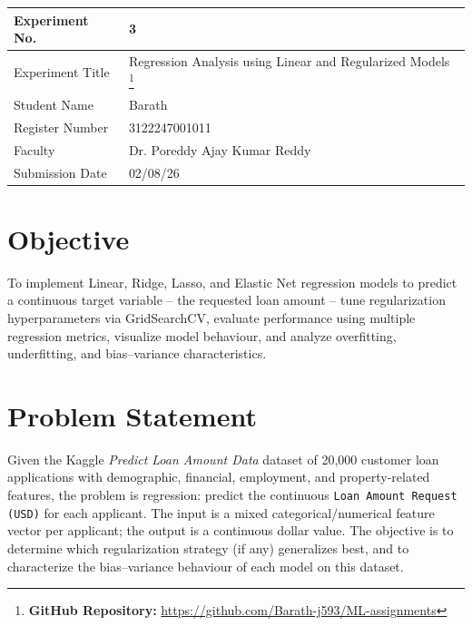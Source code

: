 \documentclass[12pt,a4paper]{article}
\begin{document}
\begin{tabular}{|p{4cm}|p{11cm}|}
\hline
Experiment No. & 3 \\ \hline
Experiment Title & Regression Analysis using Linear and Regularized Models
\footnote{\textbf{GitHub Repository: }\url{https://github.com/Barath-j593/ML-assignments}}\\ \hline
Student Name & Barath \\ \hline
Register Number & 3122247001011 \\ \hline
Faculty & Dr. Poreddy Ajay Kumar Reddy \\ \hline
Submission Date & 02/08/26 \\ \hline
\end{tabular}

\section{Objective}
To implement Linear, Ridge, Lasso, and Elastic Net regression models to predict a continuous
target variable -- the requested loan amount -- tune regularization hyperparameters via
GridSearchCV, evaluate performance using multiple regression metrics, visualize model
behaviour, and analyze overfitting, underfitting, and bias--variance characteristics.

\section{Problem Statement}
Given the Kaggle \textit{Predict Loan Amount Data} dataset of 20,000 customer loan
applications with demographic, financial, employment, and property-related features, the
problem is regression: predict the continuous \texttt{Loan Amount Request (USD)} for each
applicant. The input is a mixed categorical/numerical feature vector per applicant; the
output is a continuous dollar value. The objective is to determine which regularization
strategy (if any) generalizes best, and to characterize the bias--variance behaviour of each
model on this dataset.
\end{document}
